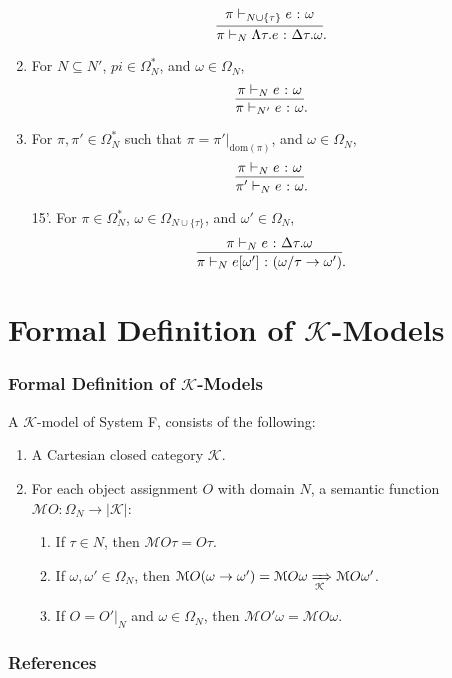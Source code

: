 \begin{frame}[allowframebreaks]
\begin{enumerate}
        \[
        \infer{\pi \vdash_N \Lambda\tau. e \colon \Delta\tau. \omega}{\pi \vdash_{N \cup \{\tau\}} e \colon \omega}.
        \]
        \item For $N \subseteq N'$, $pi \in \Omega^*_N$, and $\omega \in \Omega_N$,
        \[
        \infer{\pi \vdash_{N'} e \colon \omega}{\pi \vdash_N e \colon \omega}.
        \]
        \item For $\pi, \pi' \in \Omega^*_N$ such that $\pi = \pi'|_{\mathrm{dom}(\pi)}$, and $\omega \in \Omega_N$,
        \[
        \infer{\pi' \vdash_N e \colon \omega}{\pi \vdash_N e \colon \omega}.
        \]
    \end{enumerate}
    
    \begin{itemize}
        \item [15'.] For $\pi \in \Omega^*_N$, $\omega \in \Omega_{N \cup \{\tau\}}$, and $\omega' \in \Omega_N$,
        \[
        \infer{\pi \vdash_N e[\omega'] \colon (\omega / \tau \rightarrow \omega')}{\pi \vdash_N e \colon \Delta\tau.\omega}.
        \]
    \end{itemize}
\end{frame}

\section{Formal Definition of $\mathcal{K}$-Models}

\begin{frame}[allowframebreaks]
    \frametitle{Formal Definition of $\mathcal{K}$-Models}

    A $\mathcal{K}$-model of System F, consists of the following:
    \begin{enumerate}
        \item A Cartesian closed category $\mathcal{K}$.
        \item For each object assignment $O$ with domain $N$, a semantic function $\mathcal{M}O \colon \Omega_N \rightarrow |\mathcal{K}|$:
        \begin{enumerate}
            \item If $\tau \in N$, then $\mathcal{M}O\tau = O\tau$.
            \item If $\omega, \omega' \in \Omega_N$, then $\mathcal{M}O(\omega \rightarrow \omega') = \mathcal{M}O\omega \xRightarrow[\mathcal{K}]{} \mathcal{M}O\omega'$.
            \item If $O = O'|_N$ and $\omega \in \Omega_N$, then $\mathcal{M}O'\omega = \mathcal{M}O\omega$.
        \end{enumerate}
    \end{enumerate}
\end{frame}

\begin{frame}[t,allowframebreaks]
\nocite{*}
\frametitle{References}


\end{frame}

